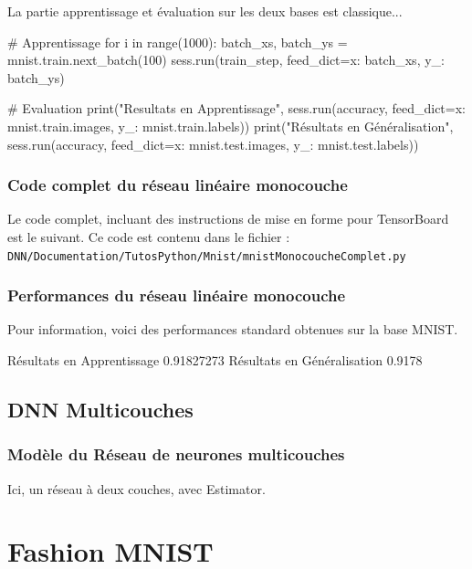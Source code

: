 \documentclass[a4paper,11pt]{book}
\begin{document}
La partie apprentissage et évaluation sur les deux bases est classique...
\begin{mypython}
# Apprentissage
for i in range(1000):
  batch_xs, batch_ys = mnist.train.next_batch(100)
  sess.run(train_step, feed_dict={x: batch_xs, y_: batch_ys})

# Evaluation
print("Resultats en Apprentissage", sess.run(accuracy, feed_dict={x: mnist.train.images, 	y_: mnist.train.labels}))
print("Résultats en Généralisation", sess.run(accuracy, feed_dict={x: mnist.test.images, 	y_: mnist.test.labels}))
\end{mypython}

\subsubsection{Code complet du réseau linéaire monocouche}
Le code complet, incluant des instructions de mise en forme pour TensorBoard est le suivant. Ce code est contenu dans le fichier :\\
\verb+DNN/Documentation/TutosPython/Mnist/mnistMonocoucheComplet.py+




\subsubsection{Performances du réseau linéaire monocouche}
\label{secPerfMnistMono}
Pour information, voici des performances standard obtenues sur la base MNIST.
\begin{myoutput}
Résultats en Apprentissage 0.91827273
Résultats en Généralisation 0.9178
\end{myoutput}

\subsection{DNN Multicouches}
\subsubsection{Modèle du Réseau de neurones multicouches}
\label{secMnistMulti}

Ici, un réseau à deux couches, avec Estimator.


\section{Fashion MNIST}
\end{document}
